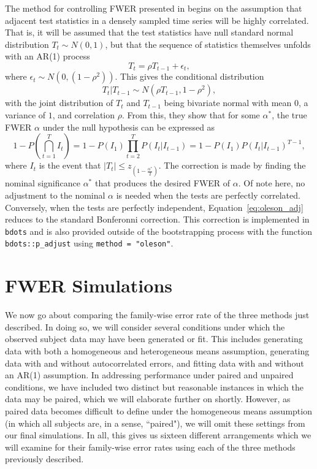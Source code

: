 \documentclass{article}
\newcommand{\xt}{\texttt}
\begin{document}
The method for controlling FWER presented in \citet{oleson2017detecting} begins on the assumption that adjacent test statistics in a densely sampled time series will be highly correlated. That is, it will be assumed that the test statistics have null standard normal distribution $T_t \sim N(0,1)$, but that the sequence of statistics themselves unfolds with an AR(1) process
\begin{equation}
T_t = \rho  T_{t-1} + \epsilon_t,
\end{equation}
where $\epsilon_t \sim N(0, (1 - \rho^2))$. This gives the conditional distribution
\begin{equation}
T_t | T_{t-1} \sim N(\rho T_{t-1}, 1 - \rho^2),
\end{equation}
with the joint distribution of $T_t$ and $T_{t-1}$ being bivariate normal with mean $0$, a variance of $1$, and correlation $\rho$. From this, they show that for some $\alpha^*$, the true FWER $\alpha$ under the null hypothesis can be expressed as 
\begin{equation}\label{eq:oleson_adj}
1 - P \left( \bigcap_{t=1}^T I_t \right) = 1 - P(I_1) \prod_{t=2}^T P(I_t | I_{t-1}) = 1 - P(I_1)P(I_t|I_{t-1})^{T-1},
\end{equation}
where $I_t$ is the event that $|T_t| \leq z_{\left(1 - \frac{\alpha^*}{2} \right)}$. The correction is made by finding the nominal significance $\alpha^*$ that produces the desired FWER of $\alpha$. Of note here, no adjustment to the nominal $\alpha$ is needed when the tests are perfectly correlated. Conversely, when the tests are perfectly independent, Equation~\ref{eq:oleson_adj} reduces to the standard Bonferonni correction. This correction is implemented in \xt{bdots} and is also provided outside of the bootstrapping process with the function \xt{bdots::p\_adjust} using \xt{method = "oleson"}.

\section{FWER Simulations}

We now go about comparing the family-wise error rate of the three methods just described. In doing so, we will consider several conditions under which the observed subject data may have been generated or fit. This includes generating data with both a homogeneous and heterogeneous means assumption, generating data with and without autocorrelated errors, and fitting data with and without an AR(1) assumption. In addressing performance under paired and unpaired conditions, we have included two distinct but reasonable instances in which  the data may be paired, which we will elaborate further on shortly. However, as paired data becomes difficult to define under the homogeneous means assumption (in which all subjects are, in a sense, ``paired"), we will omit these settings from our final simulations. In all, this gives us sixteen different arrangements which we will examine for their family-wise error rates using each of the three methods previously described.
\end{document}
